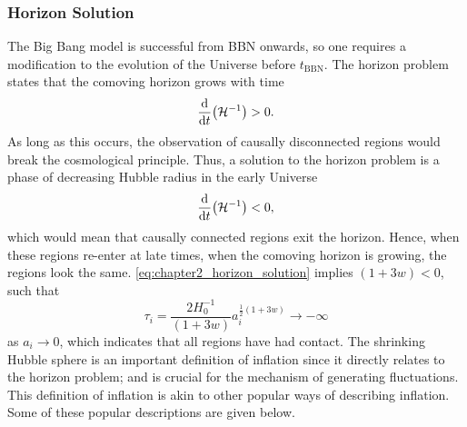 \subsubsection{Horizon Solution}

The Big Bang model is successful from BBN onwards, so one requires a modification to the evolution of the Universe before \(t_{\text{BBN}}\).
The horizon problem states that the comoving horizon grows with time
%
\begin{equation}
	\dv{t} \big(\mathcal{H}^{-1}\big)
	> 0.
\end{equation}
%
As long as this occurs, the observation of causally disconnected regions would break the cosmological principle.
Thus, a solution to the horizon problem is a phase of decreasing Hubble radius in the early Universe
%
\begin{equation}\label{eq:chapter2_horizon_solution}
	\dv{t} \big(\mathcal{H}^{-1}\big)
	< 0,
\end{equation}
%
which would mean that causally connected regions exit the horizon.
Hence, when these regions re-enter at late times, when the comoving horizon is growing, the regions look the same.
\cref{eq:chapter2_horizon_solution} implies \((1+3w) < 0\), such that
%
\begin{equation}
	\tau_{i}
	= \frac{2H_{0}^{-1}}{(1+3w)} a_{i}^{\frac{1}{2}(1+3w)}
	\rightarrow -\infty
\end{equation}
%
as \(a_{i} \rightarrow 0\), which indicates that all regions have had contact.
The shrinking Hubble sphere is an important definition of inflation since it directly relates to the horizon problem; and is crucial for the mechanism of generating fluctuations.
This definition of inflation is akin to other popular ways of describing inflation.
Some of these popular descriptions are given below.

